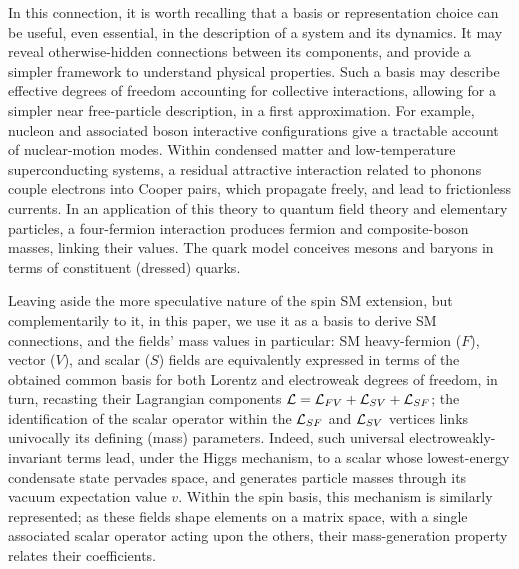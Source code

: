 \documentclass[12pt]{article}
\renewcommand\[{\begin{dmath}}
\renewcommand\]{\end{dmath}}
\begin{document}


In this connection, it is worth recalling that a basis or representation choice  can be useful, even essential,
 in the description of a   system and its dynamics. It may reveal otherwise-hidden connections between its components,
and provide a  simpler framework to  understand   physical properties. Such a basis may  describe effective degrees of freedom\cite{Landau} accounting for collective interactions, allowing for a simpler near free-particle description, in a first approximation.   For example,   nucleon  and associated boson  interactive configurations give a tractable account of nuclear-motion modes\cite {nuclear}. Within condensed matter and  low-temperature superconducting systems, a residual attractive interaction related to   phonons  couple electrons into Cooper pairs\cite{Schrieffer}, which    propagate freely, and
  lead to frictionless currents.   In an application  of this theory to  quantum field theory and elementary particles\cite{NambuJona},
 a  four-fermion   interaction   produces fermion     and composite-boson   masses,
 linking  their values.
    The quark model\cite{quarkmodel} conceives mesons and baryons in terms of constituent (dressed) quarks.





  Leaving aside  the more speculative nature of the spin SM extension, but  complementarily  to it,  in this paper, we use it as a basis  to derive   SM connections,   and the fields'  mass values in particular:
       SM  heavy-fermion ($F$),  vector ($V$), and scalar ($S$)  fields are equivalently expressed in terms of  the   obtained common  basis\cite {BesproIni}
       for  both Lorentz and electroweak  degrees of freedom,  in turn,
        recasting  their   Lagrangian   components  ${\cal L}={\cal L}_{FV}+ {\cal L}_{SV}+ {\cal L}_{SF}$; the identification of the  scalar operator  within  the
     ${\cal L}_{SF}$ and  ${\cal L}_{SV}$ vertices links univocally its defining (mass) parameters.
   Indeed, such universal electroweakly-invariant terms    lead,
   under the Higgs mechanism, to  a     scalar  whose lowest-energy condensate state pervades space,
  and generates  particle  masses through its vacuum expectation value $v$.     Within the  spin basis, this mechanism is similarly  represented;
   as these fields shape elements on a matrix space, with  a  single associated    scalar    operator acting upon the others, their  mass-generation  property
    relates  their coefficients.
\end{document}
